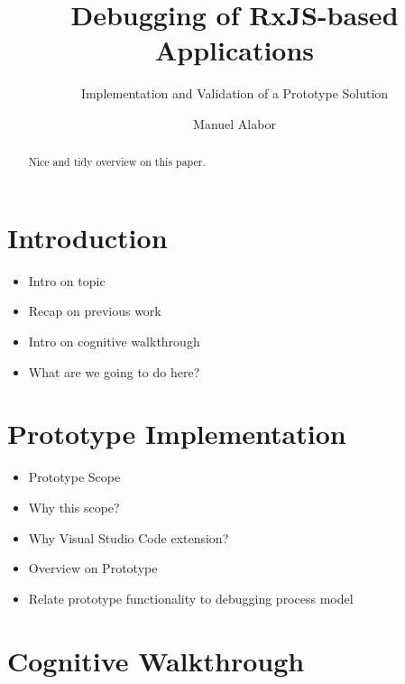 \documentclass[sigplan,screen,nonacm,review]{acmart}
\title{Debugging of RxJS-based Applications}
\subtitle{Implementation and Validation of a Prototype Solution}
\author{Manuel Alabor}
\affiliation{
	\institution{Eastern Switzerland University of Applied Sciences}
	\city{Rapperswil}
	\country{Switzerland}
}
\begin{document}
\begin{abstract}
	Nice and tidy overview on this paper.
\end{abstract}




\maketitle

\section{Introduction}
\label{sec:intro}


\begin{itemize}
	\item Intro on topic
	\item Recap on previous work
	\item Intro on cognitive walkthrough \cite{Wharton_Rieman_Clayton_Polson_1994}
	\item What are we going to do here?
\end{itemize}

\section{Prototype Implementation}
\label{sec:prototype}

\begin{itemize}
	\item Prototype Scope
	\item Why this scope?
	\item Why Visual Studio Code extension?
	\item Overview on Prototype
	\item Relate prototype functionality to debugging process model \cite{Layman_Diep_Nagappan_Singer_Deline_Venolia_2013}
\end{itemize}

\section{Cognitive Walkthrough}
\label{sec:cogitive-walkthrough}
\end{document}
